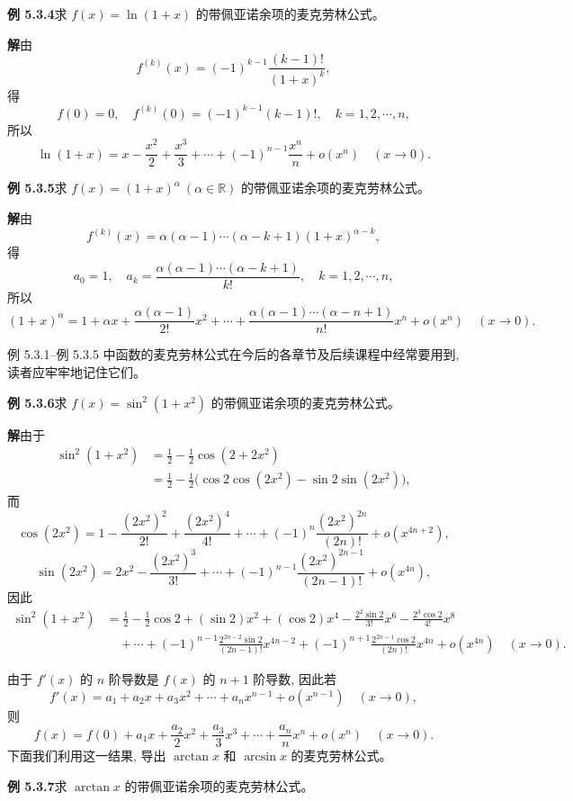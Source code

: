 \documentclass[UTF8,12pt,a4paper,fontset=fandol]{ctexart}
\begin{document}
\noindent\textbf{例 5.3.4}\quad 求 $f(x)=\ln(1+x)$ 的带佩亚诺余项的麦克劳林公式。

\noindent\textbf{解}\quad 由
\[
  f^{(k)}(x)=(-1)^{k-1}\frac{(k-1)!}{(1+x)^k},
\]
得
\[
  f(0)=0,\quad f^{(k)}(0)=(-1)^{k-1}(k-1)!,\quad k=1,2,\cdots,n,
\]
所以
\[
  \ln(1+x)=x-\frac{x^2}{2}+\frac{x^3}{3}+\cdots+(-1)^{n-1}\frac{x^n}{n}+o(x^n)\quad (x\to0).
\]

\noindent\textbf{例 5.3.5}\quad 求 $f(x)=(1+x)^\alpha\ (\alpha\in\mathbb{R})$ 的带佩亚诺余项的麦克劳林公式。

\noindent\textbf{解}\quad 由
\[
  f^{(k)}(x)=\alpha(\alpha-1)\cdots(\alpha-k+1)(1+x)^{\alpha-k},
\]
得
\[
  a_0=1,\quad
  a_k=\frac{\alpha(\alpha-1)\cdots(\alpha-k+1)}{k!},\quad k=1,2,\cdots,n,
\]
所以
\[
  (1+x)^\alpha
  =
  1+\alpha x+\frac{\alpha(\alpha-1)}{2!}x^2+\cdots
  +\frac{\alpha(\alpha-1)\cdots(\alpha-n+1)}{n!}x^n+o(x^n)
  \quad (x\to0).
\]

例 5.3.1--例 5.3.5 中函数的麦克劳林公式在今后的各章节及后续课程中经常要用到, 读者应牢牢地记住它们。

\noindent\textbf{例 5.3.6}\quad 求 $f(x)=\sin^2(1+x^2)$ 的带佩亚诺余项的麦克劳林公式。

\noindent\textbf{解}\quad 由于
\[
\begin{aligned}
  \sin^2(1+x^2)
  &=
  \frac12-\frac12\cos(2+2x^2) \\
  &=
  \frac12-\frac12\bigl(\cos2\cos(2x^2)-\sin2\sin(2x^2)\bigr),
\end{aligned}
\]
而
\[
  \cos(2x^2)=1-\frac{(2x^2)^2}{2!}+\frac{(2x^2)^4}{4!}+\cdots+(-1)^n\frac{(2x^2)^{2n}}{(2n)!}+o(x^{4n+2}),
\]
\[
  \sin(2x^2)=2x^2-\frac{(2x^2)^3}{3!}+\cdots+(-1)^{n-1}\frac{(2x^2)^{2n-1}}{(2n-1)!}+o(x^{4n}),
\]
因此
\[
\begin{aligned}
  \sin^2(1+x^2)
  &=
  \frac12-\frac12\cos2+(\sin2)x^2+(\cos2)x^4-\frac{2^2\sin2}{3!}x^6
  -\frac{2^3\cos2}{4!}x^8 \\
  &\quad+\cdots+(-1)^{n-1}\frac{2^{2n-2}\sin2}{(2n-1)!}x^{4n-2}
  +(-1)^{n+1}\frac{2^{2n-1}\cos2}{(2n)!}x^{4n}
  +o(x^{4n})
  \quad (x\to0).
\end{aligned}
\]

由于 $f'(x)$ 的 $n$ 阶导数是 $f(x)$ 的 $n+1$ 阶导数, 因此若
\[
  f'(x)=a_1+a_2x+a_3x^2+\cdots+a_nx^{n-1}+o(x^{n-1})\quad (x\to0),
\]
则
\[
  f(x)=f(0)+a_1x+\frac{a_2}{2}x^2+\frac{a_3}{3}x^3+\cdots+\frac{a_n}{n}x^n+o(x^n)\quad (x\to0).
\]
下面我们利用这一结果, 导出 $\arctan x$ 和 $\arcsin x$ 的麦克劳林公式。

\noindent\textbf{例 5.3.7}\quad 求 $\arctan x$ 的带佩亚诺余项的麦克劳林公式。
\end{document}
